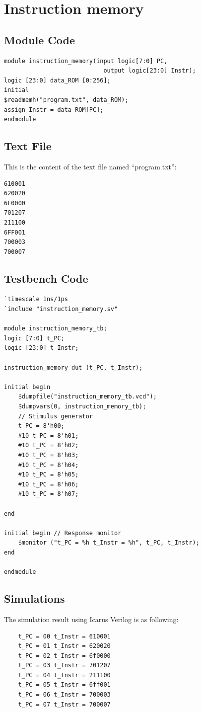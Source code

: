 \documentclass{article}
\begin{document}
\newpage
\section{Instruction memory}

\subsection{Module Code}
\begin{lstlisting}
module instruction_memory(input logic[7:0] PC,
                            output logic[23:0] Instr);
logic [23:0] data_ROM [0:256];
initial
$readmemh("program.txt", data_ROM); 
assign Instr = data_ROM[PC]; 
endmodule
\end{lstlisting}

\subsection{Text File}
This is the content of the text file named ``program.txt'':
\begin{Verbatim}
610001
620020
6F0000
701207
211100
6FF001
700003
700007
\end{Verbatim}

\subsection{Testbench Code}
\begin{lstlisting}
`timescale 1ns/1ps 
`include "instruction_memory.sv"

module instruction_memory_tb;
logic [7:0] t_PC;
logic [23:0] t_Instr;

instruction_memory dut (t_PC, t_Instr);

initial begin
    $dumpfile("instruction_memory_tb.vcd"); 
    $dumpvars(0, instruction_memory_tb);
    // Stimulus generator
    t_PC = 8'h00; 
    #10 t_PC = 8'h01;
    #10 t_PC = 8'h02;
    #10 t_PC = 8'h03;
    #10 t_PC = 8'h04;
    #10 t_PC = 8'h05;
    #10 t_PC = 8'h06;
    #10 t_PC = 8'h07;
    
end

initial begin // Response monitor
    $monitor ("t_PC = %h t_Instr = %h", t_PC, t_Instr);
end

endmodule
\end{lstlisting}

\subsection{Simulations}
The simulation result using Icarus Verilog is as following:
\begin{Verbatim}
    t_PC = 00 t_Instr = 610001
    t_PC = 01 t_Instr = 620020
    t_PC = 02 t_Instr = 6f0000
    t_PC = 03 t_Instr = 701207
    t_PC = 04 t_Instr = 211100
    t_PC = 05 t_Instr = 6ff001
    t_PC = 06 t_Instr = 700003
    t_PC = 07 t_Instr = 700007
\end{Verbatim}
\end{document}
